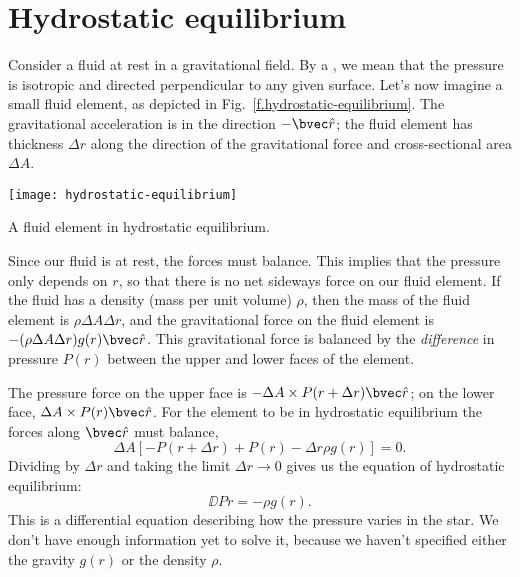 
\section{Hydrostatic equilibrium}
\label{s.hydrostatic-equilibrium}


Consider a fluid at rest in a gravitational field. By a , we mean that the pressure is isotropic and directed perpendicular to any given surface. Let's now imagine a small fluid element, as depicted in Fig.~\ref{f.hydrostatic-equilibrium}. The gravitational acceleration is in the direction $-\unitvector{r}$; the fluid element has thickness $\Delta r$ along the direction of the gravitational force and cross-sectional area $\Delta A$.
\begin{marginfigure}
\texttt{[image: hydrostatic-equilibrium]}
\caption[A fluid element in hydrostatic equilibrium]{A fluid element in hydrostatic equilibrium.
\label{f.hydrostatic-equilibrium}}
\end{marginfigure}

Since our fluid is at rest, the forces must balance. This implies that the pressure only depends on $r$, so that there is no net sideways force on our fluid element. If the fluid has a density (mass per unit volume) $\rho$, then the mass of the fluid element is $\rho\Delta A\Delta r$, and the gravitational force on the fluid element is $-(\rho\Delta A \Delta r) g(r) \unitvector{r}$. This gravitational force is balanced by the \emph{difference} in pressure $P(r)$ between the upper and lower faces of the element.

The pressure force on the upper face is $-\Delta A\times P(r+\Delta r)\unitvector{r}$; on the lower face, $\Delta A\times P(r)\unitvector{r}$. For the element to be in hydrostatic equilibrium the forces along $\unitvector{r}$ must balance,
\[
        \Delta A \left[ -P(r+\Delta r) + P(r) - \Delta r \rho g(r)  \right] = 0.
\]
Dividing by $\Delta r$ and taking the limit $\Delta r \to 0$ gives us the equation of hydrostatic equilibrium:
\begin{equation}\label{e.hydrostatic-equilibrium-g}
        \DD{P}{r} = -\rho g(r).
\end{equation}
This is a differential equation describing how the pressure varies in the star. We don't have enough information yet to solve it, because we haven't specified either the gravity $g(r)$ or the density $\rho$.

